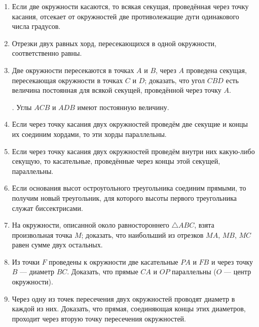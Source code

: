 \begin{center}
\end{center}

\begin{enumerate}[resume]

\item
Если две окружности касаются, то всякая секущая, проведённая через точку касания, отсекает от окружностей две противолежащие дуги одинакового числа градусов.

\item
Отрезки двух равных хорд, пересекающихся в одной окружности, соответственно равны.

\item
Две окружности пересекаются в точках $A$ и $B$, через $A$ проведена секущая, пересекающая окружности в точках $C$ и $D$;
доказать, что угол $CBD$ есть величина постоянная для всякой секущей, проведённой через точку $A$.

\smallskip
{}.
Углы $ACB$ и $ADB$ имеют постоянную величину.

\item
Если через точку касания двух окружностей проведём две секущие и концы их соединим хордами, то эти хорды параллельны.

\item
Если через точку касания двух окружностей проведём внутри них какую-либо секущую, то касательные, проведённые через концы этой секущей, параллельны.

\item
Если основания высот остроугольного треугольника соединим прямыми, то получим новый треугольник, для которого высоты первого треугольника служат биссектрисами. 

\item
На окружности, описанной около равностороннего $\triangle ABC$, взята произвольная точка $M$;
доказать, что наибольший из отрезков $MA$, $MB$, $MC$ равен сумме двух остальных.

\item
Из точки $F$ проведены к окружности две касательные $PA$ и $FB$ и через точку $B$ — диаметр $BC$.
Доказать, что прямые $CA$ и $OP$ параллельны ($O$ — центр окружности).

\item
Через одну из точек пересечения двух окружностей проводят диаметр в каждой из них.
Доказать, что прямая, соединяющая концы этих диаметров, проходит через вторую точку пересечения окружностей.


\end{enumerate}
